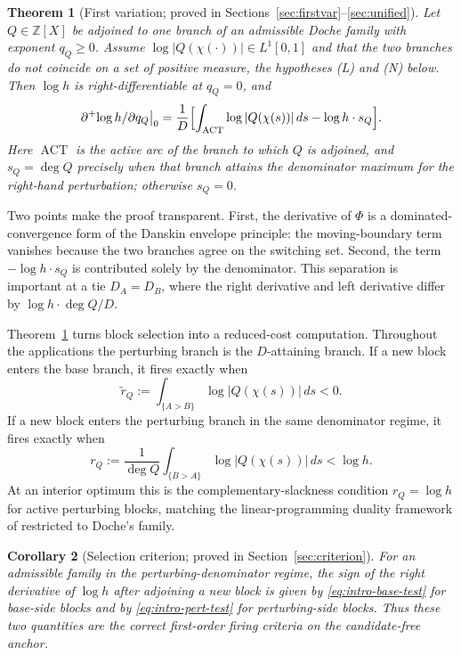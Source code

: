 \documentclass[11pt,reqno]{amsart}
\theoremstyle{plain}
\newtheorem{theorem}{Theorem}
\newtheorem{corollary}[theorem]{Corollary}
\theoremstyle{definition}
\theoremstyle{remark}
\newcommand{\Z}{\mathbb{Z}}
\newcommand{\dplus}{\partial^{+}}
\newcommand{\dA}{D_A}
\newcommand{\dB}{D_B}
\DeclareMathOperator{\ACT}{ACT}
\begin{document}
\begin{theorem}[First variation; proved in Sections~\ref{sec:firstvar}--\ref{sec:unified}]
\label{thm:main}
Let $Q\in\Z[X]$ be adjoined to one branch of an admissible Doche family with exponent
$q_Q\ge0$.  Assume $\log|Q(\chi(\cdot))|\in L^1[0,1]$ and that the two branches do not
coincide on a set of positive measure, the hypotheses \emph{(L)} and \emph{(N)} below.
Then $\log h$ is right-differentiable at $q_Q=0$, and
\begin{equation}\label{eq:main}
  \dplus\!\log h/\partial q_Q\big|_0
  =\frac1D\Bigl[\int_{\ACT}\log|Q(\chi(s))|\,ds-\log h\cdot s_Q\Bigr].
\end{equation}
Here $\ACT$ is the active arc of the branch to which $Q$ is adjoined, and
$s_Q=\deg Q$ precisely when that branch attains the denominator maximum for the
right-hand perturbation; otherwise $s_Q=0$.
\end{theorem}

Two points make the proof transparent.  First, the derivative of $\Phi$ is a
dominated-convergence form of the Danskin envelope principle: the moving-boundary term
vanishes because the two branches agree on the switching set.  Second, the term
$-\log h\cdot s_Q$ is contributed solely by the denominator.  This separation is
important at a tie $\dA=\dB$, where the right derivative and left derivative differ by
$\log h\cdot\deg Q/D$.

Theorem~\ref{thm:main} turns block selection into a reduced-cost computation.
Throughout the applications the perturbing branch is the $D$-attaining branch.  If a
new block enters the base branch, it fires exactly when
\begin{equation}\label{eq:intro-base-test}
  \widetilde r_Q:=\int_{\{A>B\}}\log|Q(\chi(s))|\,ds<0.
\end{equation}
If a new block enters the perturbing branch in the same denominator regime, it fires
exactly when
\begin{equation}\label{eq:intro-pert-test}
  r_Q:=\frac1{\deg Q}\int_{\{B>A\}}\log|Q(\chi(s))|\,ds<\log h.
\end{equation}
At an interior optimum this is the complementary-slackness condition
$r_Q=\log h$ for active perturbing blocks, matching the linear-programming duality
framework of \citet{BMQS} restricted to Doche's family.

\begin{corollary}[Selection criterion; proved in Section~\ref{sec:criterion}]
\label{cor:criterion}
For an admissible family in the perturbing-denominator regime, the sign of the
right derivative of $\log h$ after adjoining a new block is given by
\eqref{eq:intro-base-test} for base-side blocks and by \eqref{eq:intro-pert-test} for
perturbing-side blocks.  Thus these two quantities are the correct first-order firing
criteria on the candidate-free anchor.
\end{corollary}
\end{document}
